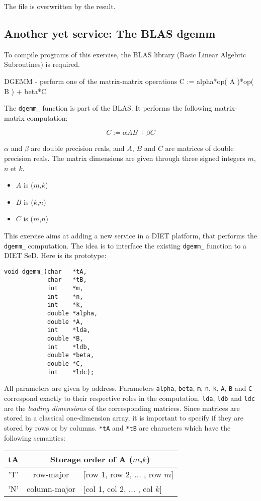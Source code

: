 \documentclass[11pt,a4paper]{article}
\begin{document}
The file is overwritten by the result.

\subsection{Another yet service: The BLAS dgemm}

To compile programs of this exercise, the BLAS library (Basic Linear
Algebric Subroutines) is required.

DGEMM  -  perform  one of the matrix-matrix operations   C :=
       alpha*op( A )*op( B ) + beta*C

The \texttt{dgemm\_} function is part of the BLAS.  It performs the
following matrix-matrix computation:

$$ C := \alpha A B + \beta C $$

$\alpha$ and $\beta$ are double precision reals, and $A$, $B$ and $C$ are
matrices of double precision reals.
The matrix dimensions are given through three signed integers $m$, $n$ et $k$.
\begin{itemize}
\item{$A$ is ($m$,$k$)}
\item{$B$ is ($k$,$n$)}
\item{$C$ is ($m$,$n$)}
\end{itemize}

This exercise aims at adding a new service in a DIET platform, that
performs the \texttt{dgemm\_} computation. The idea is to interface
the existing \texttt{dgemm\_} function to a DIET SeD. Here is its
prototype:

\begin{verbatim}
void dgemm_(char   *tA,
            char   *tB,
            int    *m,
            int    *n,
            int    *k,
            double *alpha,
            double *A,
            int    *lda,
            double *B,
            int    *ldb,
            double *beta,
            double *C,
            int    *ldc);
\end{verbatim}

All parameters are given by address. Parameters \texttt{alpha}, \texttt{beta},
\texttt{m}, \texttt{n}, \texttt{k}, \texttt{A}, \texttt{B} and \texttt{C}
correspond exactly to their respective roles in the computation. \texttt{lda},
\texttt{ldb} and \texttt{ldc} are the \emph{leading dimensions} of the
corresponding matrices. Since matrices are stored in a classical one-dimension
array, it is important to specify if they are stored by rows or by columns.
\texttt{*tA} and \texttt{*tB} are characters which have the following semantics:
\begin{center}
\begin{tabular}{|c|c|l|}\hline
tA  &  \multicolumn{2}{c|}{Storage order of A ($m$,$k$)}\\\hline
'T' &  row-major    & [row 1, row 2, ... , row $m$]\\
'N' &  column-major & [col 1, col 2, ... , col $k$] \\\hline
\end{tabular}
\end{center}
\end{document}

